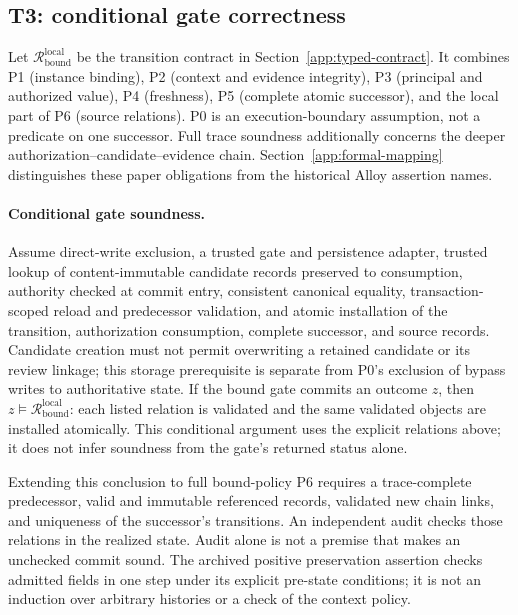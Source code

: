 

\subsection{T3: conditional gate correctness}
\label{app:t3}
Let $\mathcal R_{\mathrm{bound}}^{\mathrm{local}}$ be the transition contract in Section~\ref{app:typed-contract}. It combines P1 (instance binding), P2 (context and evidence integrity), P3 (principal and authorized value), P4 (freshness), P5 (complete atomic successor), and the local part of P6 (source relations). P0 is an execution-boundary assumption, not a predicate on one successor. Full trace soundness additionally concerns the deeper authorization--candidate--evidence chain. Section~\ref{app:formal-mapping} distinguishes these paper obligations from the historical Alloy assertion names.

\paragraph{Conditional gate soundness.}
Assume direct-write exclusion, a trusted gate and persistence adapter, trusted lookup of content-immutable candidate records preserved to consumption, authority checked at commit entry, consistent canonical equality, transaction-scoped reload and predecessor validation, and atomic installation of the transition, authorization consumption, complete successor, and source records. Candidate creation must not permit overwriting a retained candidate or its review linkage; this storage prerequisite is separate from P0's exclusion of bypass writes to authoritative state. If the bound gate commits an outcome $z$, then $z\models\mathcal R_{\mathrm{bound}}^{\mathrm{local}}$: each listed relation is validated and the same validated objects are installed atomically. This conditional argument uses the explicit relations above; it does not infer soundness from the gate's returned status alone.

Extending this conclusion to full bound-policy P6 requires a trace-complete predecessor, valid and immutable referenced records, validated new chain links, and uniqueness of the successor's transitions. An independent audit checks those relations in the realized state. Audit alone is not a premise that makes an unchecked commit sound. The archived positive preservation assertion checks admitted fields in one step under its explicit pre-state conditions; it is not an induction over arbitrary histories or a check of the context policy.

